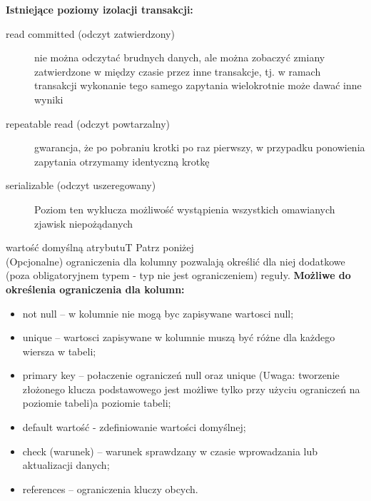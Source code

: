\textbf {Istniejące poziomy izolacji transakcji:}
\begin{description}
\item[read committed (odczyt zatwierdzony)] nie można odczytać brudnych danych, ale można zobaczyć zmiany zatwierdzone w między czasie przez inne transakcje, tj. w ramach transakcji wykonanie tego samego zapytania wielokrotnie może dawać inne wyniki
\item[repeatable read (odczyt powtarzalny)] gwarancja, że po pobraniu krotki
po raz pierwszy, w przypadku ponowienia zapytania otrzymamy identyczną krotkę
\item[serializable (odczyt uszeregowany)] Poziom ten wyklucza możliwość wystąpienia wszystkich omawianych zjawisk niepożądanych
\end{description}
 

{wartość domyślną atrybutu}{T}
{Patrz poniżej}{\\}
\noindent
(Opcjonalne) ograniczenia dla kolumny pozwalają określić dla niej dodatkowe (poza obligatoryjnem typem - typ nie jest ograniczeniem) reguły.
\textbf {Możliwe do określenia ograniczenia dla kolumn:}
\begin{itemize}
	\item not null – w kolumnie nie mogą byc zapisywane wartosci null;
	\item unique – wartosci zapisywane w kolumnie muszą być różne dla każdego wiersza w
tabeli;
	\item primary key – połaczenie ograniczeń null oraz unique (Uwaga: tworzenie złożonego klucza podstawowego jest możliwe tylko przy użyciu ograniczeń na poziomie tabeli)a poziomie tabeli;
	\item default wartość - zdefiniowanie wartości domyślnej;
	\item check (warunek) – warunek sprawdzany w czasie wprowadzania lub aktualizacji
danych;
	\item references – ograniczenia kluczy obcych.
\end{itemize}




